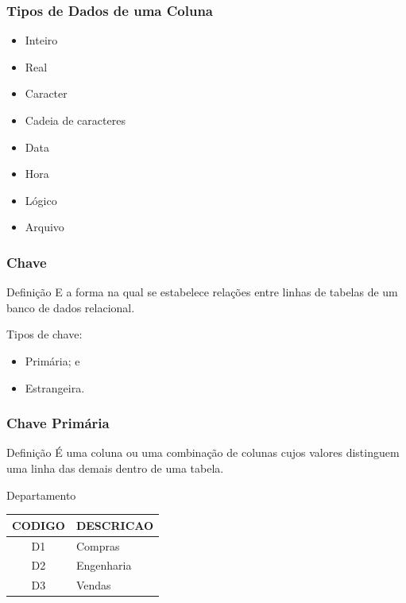 \documentclass{beamer}
\begin{document}
\begin{frame}
\frametitle{Tipos de Dados de uma Coluna}

\begin{itemize}
 	\item Inteiro
	\item Real
	\item Caracter
	\item Cadeia de caracteres
	\item Data
	\item Hora
	\item Lógico
	\item Arquivo
\end{itemize}
\end{frame}

\begin{frame}
\frametitle{Chave}

\begin{block}{Definição}
	E a forma na qual se estabelece relações entre linhas de tabelas de um
	banco de dados relacional.
\end{block}\vfill

Tipos de chave:
\begin{itemize}
	\item Primária; e 
	\item Estrangeira.
\end{itemize}
\end{frame}

\begin{frame}
\frametitle{Chave Primária}

\begin{block}{Definição}
	É uma coluna ou uma combinação de colunas cujos valores distinguem uma linha das demais dentro de uma tabela.
\end{block}\vfill

\begin{exampleblock}{Departamento}
\centering
\begin{tabular}{|c|l|}
		\hline
		CODIGO & DESCRICAO \\ \hline
		D1 & Compras \\ \hline
		D2 & Engenharia \\ \hline
		D3 & Vendas \\ \hline
\end{tabular}
\end{exampleblock}		
\end{frame}
\end{document}
